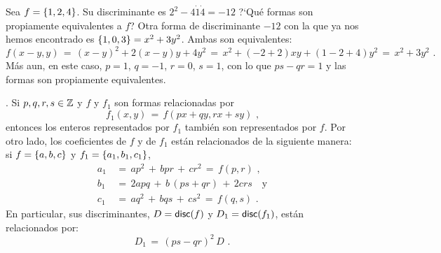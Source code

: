 \begin{ejemDefiniciones}\label{ejem:definiciones:equivalencia:traslacion}
	Sea $f=\left\{1,2,4\right\}$. Su discriminante es
	$2^2-4\dot 1\dot 4=-12$
	?`Qu\'e formas son propiamente equivalentes a $f$?
	Otra forma de discriminante $-12$ con la que ya nos hemos
	encontrado es $\left\{1,0,3\right\}=x^2+3y^2$.
	Ambas son equivalentes:
	\begin{displaymath}
		f(x-y,y)\,=\,(x-y)^2+2(x-y)y+4y^2\,=\,
			x^2+(-2+2)xy+(1-2+4)y^2\,=\,
			x^2+3y^2
		\text{ .}
	\end{displaymath}
	M\'as aun, en este caso, $p=1$, $q=-1$, $r=0$, $s=1$,
	con lo que $ps-qr=1$ y las formas son propiamente equivalentes.
\end{ejemDefiniciones}

\begin{obsDefiniciones}\label{obs:definiciones:equivalencia:invariantes}
	\quedacomoejercicio.
	Si $p,q,r,s\in\mathbb{Z}$ y $f$ y $f_1$ son formas relacionadas por
	\begin{equation}
		\label{eq:definiciones:equivalencia:cambio}
		f_1(x,y)\,=\,f(px+qy,rx+sy)
		\text{ ,}
	\end{equation}
	entonces los enteros representados por $f_1$ tambi\'en son
	representados por $f$.
	Por otro lado, los coeficientes de $f$ y de $f_1$ est\'an
	relacionados de la siguiente manera:
	si $f=\left\{a,b,c\right\}$ y $f_1=\left\{a_1,b_1,c_1\right\}$,
	\begin{equation}
		\label{eq:definiciones:equivalencia:coeficientes}
		\begin{aligned}
			a_1 & \,=\, ap^2\,+\,bpr\,+\,cr^2\,=\,f(p,r)
				\text{ ,} \\
			b_1 & \,=\, 2apq\,+\,b\,(ps+qr)\,+\,2crs
				\quad\text{y} \\
			c_1 & \,=\, aq^2\,+\,bqs\,+\,cs^2\,=\,f(q,s)
				\text{ .}
		\end{aligned}
	\end{equation}
	En particular, sus discriminantes, $D=\mathsf{disc}(f)$ y
	$D_1=\mathsf{disc}(f_1)$, est\'an relacionados por:
	\begin{equation}
		\label{eq:definiciones:equivalencia:discriminantes}
		D_1\,=\,(ps-qr)^2\,D
		\text{ .}
	\end{equation}
\end{obsDefiniciones}

